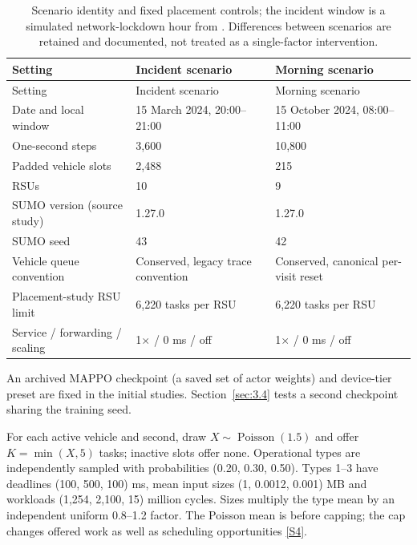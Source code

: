 \documentclass[12pt,a4paper]{article}
\begin{document}
\begingroup
\singlespacing\footnotesize\setlength{\tabcolsep}{3pt}
\begin{xltabular}{\textwidth}{@{}YYY@{}}
\caption[Scenario identities and controls]{Scenario identity and fixed placement controls; the incident window is a simulated network-lockdown hour from \cite{ref47}. Differences between scenarios are retained and documented, not treated as a single-factor intervention.}\label{tab:2} \\
\toprule
Setting & Incident scenario & Morning scenario \\
\midrule\endfirsthead
\toprule
Setting & Incident scenario & Morning scenario \\
\midrule\endhead
\bottomrule\endfoot
Date and local window & 15 March 2024, 20:00--21:00 & 15 October 2024, 08:00--11:00 \\
One-second steps & 3,600 & 10,800 \\
Padded vehicle slots & 2,488 & 215 \\
RSUs & 10 & 9 \\
SUMO version (source study) & 1.27.0 \cite{ref47} & 1.27.0 \cite{ref47} \\
SUMO seed & 43 & 42 \\
Vehicle queue convention & Conserved, legacy trace convention & Conserved, canonical per-visit reset \\
Placement-study RSU limit & 6,220 tasks per RSU & 6,220 tasks per RSU \\
Service / forwarding / scaling & 1\ensuremath{\times} / 0 ms / off & 1\ensuremath{\times} / 0 ms / off \\
\end{xltabular}
\endgroup

An archived MAPPO checkpoint (a saved set of actor weights) and device-tier preset are fixed in the initial studies. Section~\ref{sec:3.4} tests a second checkpoint sharing the training seed.

For each active vehicle and second, draw $X\sim\operatorname{Poisson}(1.5)$ and offer $K=\min(X,5)$ tasks; inactive slots offer none. Operational types are independently sampled with probabilities (0.20, 0.30, 0.50). Types 1--3 have deadlines (100, 500, 100) ms, mean input sizes (1, 0.0012, 0.001) MB and workloads (1,254, 2,100, 15) million cycles. Sizes multiply the type mean by an independent uniform 0.8--1.2 factor. The Poisson mean is before capping; the cap changes offered work as well as scheduling opportunities \hyperref[source-s4]{[S4]}.
\end{document}
